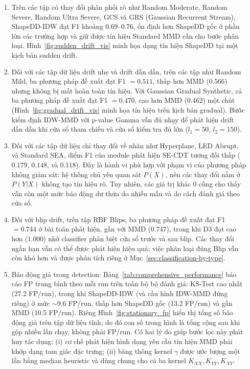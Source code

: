\begin{enumerate}
	\item Trên các tập có thay đổi phân phối rõ như Random Moderate, Random Severe, Random Ultra Severe, GCS và GRS (Gaussian Recurrent Stream), ShapeDD-IDW đạt F1 khoảng $0.69$--$0.76$, ổn định hơn ShapeDD gốc ở phần lớn các trường hợp và giữ được tín hiệu Standard MMD cần cho bước phân loại. Hình~\ref{fig:sudden_drift_vis} minh họa dạng tín hiệu ShapeDD tại một kịch bản sudden drift.
	\item Đối với các tập dữ liệu drift nhẹ và drift dần dần, trên các tập như Random Mild, ba phương pháp đề xuất đạt F1 $= 0.511$, thấp hơn MMD ($0.566$) nhưng không bị mất hoàn toàn tín hiệu. Với Gaussian Gradual Synthetic, cả ba phương pháp đề xuất đạt F1 $= 0.470$, cao hơn MMD ($0.462$) một chút (Hình~\ref{fig:gradual_drift_vis} minh họa tín hiệu trên kịch bản gradual). Bước kiểm định IDW-MMD với p-value Gamma vẫn đủ nhạy để phát hiện drift dần dần khi cửa sổ tham chiếu và cửa sổ kiểm tra đủ lớn ($l_1 = 50$, $l_2 = 150$).
	\item Đối với các tập dữ liệu chỉ thay đổi về nhãn như Hyperplane, LED Abrupt, và Standard SEA, điểm F1 của module phát hiện SE-CDT tương đối thấp ($0.179$, $0.148$, và $0.118$). Đây là hành vi phù hợp với phạm vi của phương pháp không giám sát: hệ thống chủ yếu quan sát $P(X)$, nên các thay đổi nằm ở $P(Y|X)$ không tạo tín hiệu rõ. Tuy nhiên, các giá trị khác 0 cũng cho thấy vẫn còn một mức báo động dư thừa do nhiễu mẫu và do cách đánh giá theo cửa sổ.
	\item Đối với blip drift, trên tập RBF Blips, ba phương pháp đề xuất đạt F1 $= 0.744$ ở bài toán phát hiện, gần với MMD ($0.747$), trong khi D3 đạt cao hơn ($1.000$) nhờ classifier phân biệt cửa sổ trước và sau blip. Các thay đổi ngắn hạn vẫn có thể được phát hiện hiệu quả; việc phân loại đúng Blip vẫn còn khó hơn và được phân tích riêng ở Mục~\ref{sec:classification-by-type}.
	\item Báo động giả trong detection:
	      Bảng~\ref{tab:comprehensive_performance} báo cáo FP trung bình theo mỗi run trên toàn bộ bộ đánh giá: KS-Test cao nhất (27.2 FP/run), trong khi ShapeDD-IDW (và cấu hình IDW-MMD đứng riêng) ở mức $\sim 9.6$ FP/run, thấp hơn ShapeDD gốc (13.2 FP/run) và gần MMD (10.5 FP/run). Riêng Hình~\ref{fig:stationary_fp} hiển thị tổng số báo động giả trên tập dữ liệu tĩnh; do đó con số trong hình là tổng cộng sau khi gộp nhiều lần chạy, không phải FP/run. Có hai lý do giúp bước lọc này phát huy tác dụng: (i) cơ chế phát hiện hình dạng yêu cầu tín hiệu MMD phải khớp dạng tam giác đặc trưng; (ii) băng thông kernel $\gamma$ được ước lượng một lần bằng median heuristic và dùng chung cho cả ba kernel $K_{XX}, K_{YY}, K_{XY}$.
\end{enumerate}

